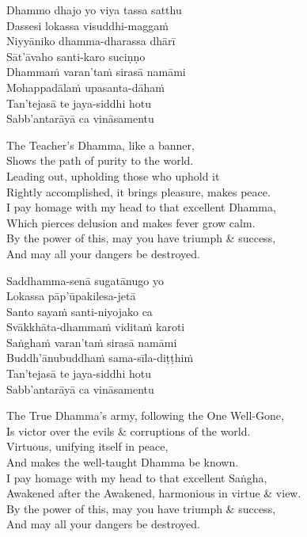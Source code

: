 \begin{pali-hang-continued}
  Dhammo dhajo yo viya tassa satthu\\
  Dassesi lokassa visuddhi-maggaṁ\\
  Niyyāniko dhamma-dharassa dhārī\\
  Sāt'āvaho santi-karo suciṇṇo\\
  Dhammaṁ varan'taṁ sirasā namāmi\\
  Mohappadālaṁ upasanta-dāhaṁ\\
  Tan'tejasā te jaya-siddhi hotu\\
  Sabb'antarāyā ca vināsamentu
\end{pali-hang-continued}

\begin{english-verses}
  The Teacher's Dhamma, like a banner,\\
  Shows the path of purity to the world.\\
  Leading out, upholding those who uphold it\\
  Rightly accomplished, it brings pleasure, makes peace.\\
  I pay homage with my head to that excellent Dhamma,\\
  Which pierces delusion and makes fever grow calm.\\
  By the power of this, may you have triumph \& success,\\
  And may all your dangers be destroyed.
\end{english-verses}

\begin{pali-hang-continued}
  Saddhamma-senā sugatānugo yo\\
  Lokassa pāp'ūpakilesa-jetā\\
  Santo sayaṁ santi-niyojako ca\\
  Svākkhāta-dhammaṁ viditaṁ karoti\\
  Saṅghaṁ varan'taṁ sirasā namāmi\\
  Buddh'ānubuddhaṁ sama-sīla-diṭṭhiṁ\\
  Tan'tejasā te jaya-siddhi hotu\\
  Sabb'antarāyā ca vināsamentu
\end{pali-hang-continued}

\begin{english-verses}
  The True Dhamma's army, following the One Well-Gone,\\
  Is victor over the evils \& corruptions of the world.\\
  Virtuous, unifying itself in peace,\\
  And makes the well-taught Dhamma be known.\\
  I pay homage with my head to that excellent Saṅgha,\\
  Awakened after the Awakened, harmonious in virtue \& view.\\
  By the power of this, may you have triumph \& success,\\
  And may all your dangers be destroyed.
\end{english-verses}

